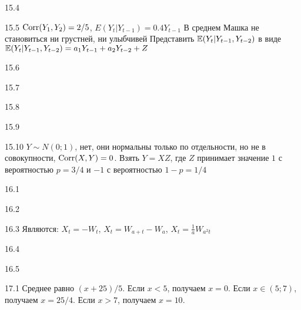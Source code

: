 \begin{solution}{{15.4}}
\end{solution}
\protect \hypertarget {soln:15.5}{}
\begin{solution}{{15.5}}
  $\operatorname{Corr}(Y_1, Y_2) = 2/5$, $E(Y_t | Y_{t-1}) = 0.4 Y_{t-1}$
  В среднем Машка не становиться ни грустней, ни улыбчивей
  Представить $\mathbb{E}(Y_t | Y_{t-1}, Y_{t-2})$ в виде $\mathbb{E}(Y_t | Y_{t-1}, Y_{t-2}) = a_1 Y_{t-1} + a_2 Y_{t-2} + Z$
\end{solution}
\protect \hypertarget {soln:15.6}{}
\begin{solution}{{15.6}}
\end{solution}
\protect \hypertarget {soln:15.7}{}
\begin{solution}{{15.7}}
\end{solution}
\protect \hypertarget {soln:15.8}{}
\begin{solution}{{15.8}}
\end{solution}
\protect \hypertarget {soln:15.9}{}
\begin{solution}{{15.9}}
\end{solution}
\protect \hypertarget {soln:15.10}{}
\begin{solution}{{15.10}}
  $Y \sim N(0;1)$, нет, они нормальны только по отдельности, но не в совокупности, $\operatorname{Corr}(X,Y)=0$. Взять $Y=XZ$, где $Z$ принимает значение $1$ с вероятностью $p=3/4$ и $-1$ с вероятностью $1-p=1/4$
\end{solution}
\protect \hypertarget {soln:16.1}{}
\begin{solution}{{16.1}}
\end{solution}
\protect \hypertarget {soln:16.2}{}
\begin{solution}{{16.2}}
\end{solution}
\protect \hypertarget {soln:16.3}{}
\begin{solution}{{16.3}}
Являются: $X_{t}=-W_{t}$, $X_{t}=W_{a+t}-W_{a}$, $X_{t}=\frac{1}{a}W_{a^{2}t}$
\end{solution}
\protect \hypertarget {soln:16.4}{}
\begin{solution}{{16.4}}
\end{solution}
\protect \hypertarget {soln:16.5}{}
\begin{solution}{{16.5}}
\end{solution}
\protect \hypertarget {soln:17.1}{}
\begin{solution}{{17.1}}
Среднее равно $(x+25)/5$. Если $x<5$, получаем $x=0$. Если $x \in (5; 7)$, получаем $x=25/4$. Если $x>7$, получаем $x=10$.
\end{solution}
